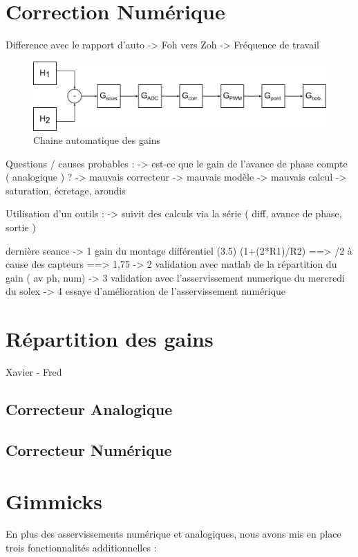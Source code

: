 \documentclass[11pt, french]{article} %
\begin{document}
\section{Correction Numérique}

Difference avec le rapport d'auto
-> Foh vers Zoh
-> Fréquence de travail

\begin{figure}[h!]
	\centering
	\includegraphics[width = 16cm]{SolutionNumerique/Gain.png} 
	\caption{Chaine automatique des gains}
\end{figure}

Questions / causes probables :
-> est-ce que le gain de l'avance de phase compte ( analogique ) ?
-> mauvais correcteur
-> mauvais modèle
-> mauvais calcul -> saturation, écretage, arondis

Utilisation d'un outils :
-> suivit des calculs via la série ( diff, avance de phase, sortie )

dernière seance
-> 1 gain du montage différentiel (3.5) (1+(2*R1)/R2) ==> /2 à cause des capteurs ==> 1,75
-> 2 validation avec matlab de la répartition du gain ( av ph, num)
-> 3 validation avec l'asservissement numerique du mercredi du solex
-> 4 essaye d'amélioration de l'asservissement numérique


\section{Répartition des gains}
Xavier - Fred
\subsection{Correcteur Analogique}
\subsection{Correcteur Numérique}

\section{Gimmicks}
 
 En plus des asservissements numérique et analogiques, nous avons mis en place trois fonctionnalités additionnelles :
 
\end{document}
